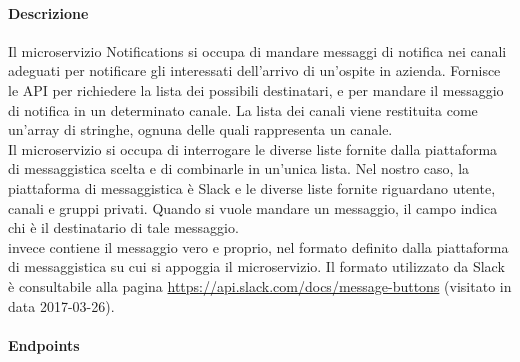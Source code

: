 \paragraph{Descrizione}
Il microservizio Notifications si occupa di mandare messaggi di notifica nei canali adeguati per notificare gli interessati dell'arrivo di un'ospite in azienda. Fornisce le API per richiedere la lista dei possibili destinatari, e per mandare il messaggio di notifica in un determinato canale. La lista dei canali viene restituita come un'array di stringhe, ognuna delle quali rappresenta un canale.\\
Il microservizio si occupa di interrogare le diverse liste fornite dalla piattaforma di messaggistica scelta e di combinarle in un'unica lista. Nel nostro caso, la piattaforma di messaggistica è Slack e le diverse liste fornite riguardano utente, canali e gruppi privati. Quando si vuole mandare un messaggio, il campo  indica chi è il destinatario di tale messaggio.\\  invece contiene il messaggio vero e proprio, nel formato definito dalla piattaforma di messaggistica su cui si appoggia il microservizio. Il formato utilizzato da Slack è consultabile alla pagina \url{https://api.slack.com/docs/message-buttons} (visitato in data 2017-03-26).
\paragraph{Endpoints}

